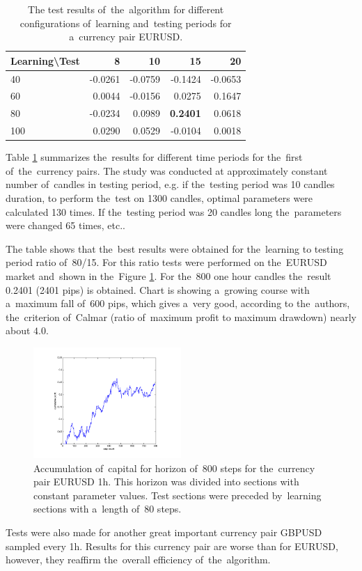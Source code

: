 \documentclass[runningheads,a4paper]{llncs}
\begin{document}
\begin{table}[h!]
\centering
\caption{The test results of~the~algorithm for different configurations of~learning and~testing periods for a~currency pair EURUSD.}
\label{tab:tab1}
\begin{tabular}{|l|r|r|r|r|} \hline
Learning\textbackslash Test &	8	 &	10 &		15	 &	20 \\ \hline
40 &		-0.0261 &		-0.0759	 &	-0.1424	 &	-0.0653 \\ \hline
60 &		0.0044 &		-0.0156 &		0.0275 &		0.1647 \\ \hline
80 &		-0.0234 &		0.0989 &		\textbf{0.2401} &		0.0618 \\ \hline
100	 &	0.0290 &		0.0529 &		-0.0104	 &	0.0018 \\ \hline
\end{tabular}
\end{table}
\FloatBarrier
Table \ref{tab:tab1} summarizes the~results for different time periods for the~first of~the~currency pairs. The study was conducted at approximately constant number of~candles in testing period, e.g. if the~testing period was 10 candles duration, to perform the~test on 1300 candles, optimal parameters were calculated 130 times. If the~testing period was 20 candles long the~parameters were changed 65 times, etc..

The table shows that the~best results were obtained for the~learning to testing period ratio of~80/15. For this ratio tests were performed on the~EURUSD market and~shown in the~Figure \ref{fig:fig8}. For the~800 one hour candles the~result 0.2401 (2401 pips) is obtained. Chart is showing a~growing course with a~maximum fall of~600 pips, which gives a~very good, according to the~authors, the~criterion of~Calmar (ratio of~maximum profit to maximum drawdown) nearly about $4.0$.\\

\begin{figure}[h!]
\centering
\includegraphics[width = 0.5\textwidth]{figures/rys8.png}
\caption{Accumulation of~capital for horizon of~800 steps for the~currency pair EURUSD 1h. This horizon was divided into sections with constant parameter values. Test sections were preceded by~learning sections with a~length of~80 steps.}
\label{fig:fig8}
\end{figure}
\FloatBarrier
Tests were also made for another great important currency pair GBPUSD sampled every 1h. Results for this currency pair are worse than for EURUSD, however, they reaffirm the~overall efficiency of~the~algorithm.\\
\end{document}

